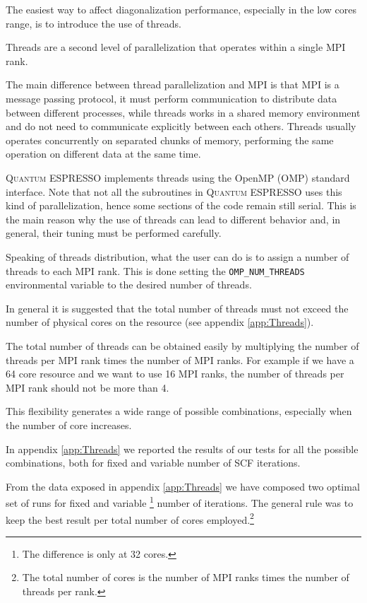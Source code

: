 \documentclass[a4paper,12pt]{article}
\newcommand\QE{\textsc{Quantum} ESPRESSO }
\begin{document}
The easiest way to affect diagonalization performance, especially in the low cores range, is to introduce the use of threads.


Threads are a second level of parallelization that operates within a single MPI rank.

The main difference between thread parallelization and MPI is that MPI is a message passing protocol, it must perform communication to distribute data between different processes, while threads works in a shared memory environment and do not need to communicate explicitly between each others. 
Threads usually operates concurrently on separated chunks of memory, performing the same operation on different data at the same time.


\QE implements threads using the OpenMP (OMP) standard interface\cite{OMP}.
Note that not all the subroutines in \QE uses this kind of parallelization, hence some sections of the code remain still serial.
This is the main reason why the use of threads can lead to different behavior and, in general, their tuning must be performed carefully.

Speaking of threads distribution, what the user can do is to assign a number of threads to each MPI rank.
This is done setting the \texttt{OMP\_NUM\_THREADS} environmental variable to the desired number of threads.

In general it is suggested that the total number of threads must not exceed the number of physical cores on the resource (see appendix \ref{app:Threads}).

The total number of threads can be obtained easily by multiplying the number of threads per MPI rank times the number of MPI ranks.
For example if we have a 64 core resource and we want to use 16 MPI ranks, the number of threads per MPI rank should not be more than 4.

This flexibility generates a wide range of possible combinations, especially when the number of core increases.

In appendix \ref{app:Threads} we reported the results of our tests for all the possible combinations, both for fixed and variable number of SCF iterations.

From the data exposed in appendix \ref{app:Threads} we have composed two optimal set of runs for fixed and variable \footnote{The difference is only at 32 cores.} number of iterations.
The general rule was to keep the best result per total number of cores employed.\footnote{ The total number of cores is the number of MPI ranks times the number of threads per rank.}
\end{document}
